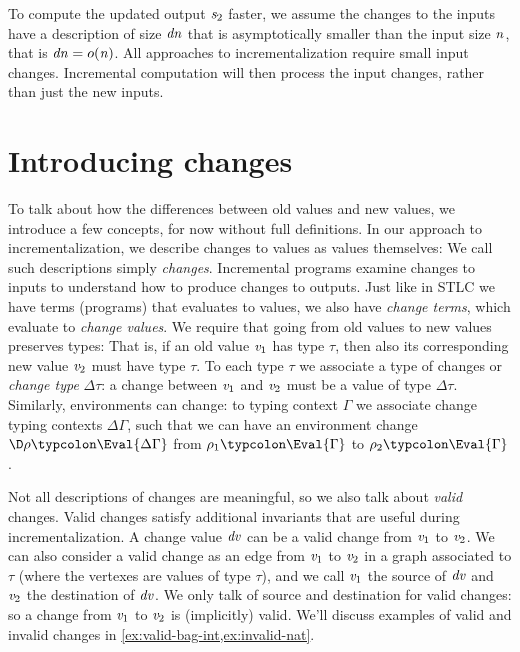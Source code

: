 To compute the updated output \ensuremath{\Varid{s}_{2}} faster, we assume the changes to the
inputs have a description of size \ensuremath{\Varid{dn}} that is asymptotically smaller than the
input size \ensuremath{\Varid{n}}, that is \ensuremath{\Varid{dn}\mathrel{=}o(\Varid{n})}. All approaches to incrementalization
require small input changes. Incremental computation will then process the input
changes, rather than just the new inputs.

\section{Introducing changes}
\label{sec:change-intro}
To talk about how the differences between old values and new
values, we introduce a few concepts, for now without full definitions.
In our approach to
incrementalization, we describe changes to values as values
themselves: We call such descriptions simply \emph{changes}.
Incremental programs examine changes to inputs to understand how to produce
changes to outputs. Just
like in STLC we have terms (programs) that evaluates to values,
we also have \emph{change terms}, which evaluate to \emph{change
  values}. We require that going from old values to new values
preserves types: That is, if an old value \ensuremath{\Varid{v}_{1}} has type \ensuremath{\tau},
then also its corresponding new value \ensuremath{\Varid{v}_{2}} must have type \ensuremath{\tau}.
To each type \ensuremath{\tau} we associate a type of changes or \emph{change type}
\ensuremath{\Delta \tau}: a change between \ensuremath{\Varid{v}_{1}} and \ensuremath{\Varid{v}_{2}} must be a value of type \ensuremath{\Delta \tau}.
Similarly, environments can change: to typing context \ensuremath{\Gamma} we associate
change typing contexts \ensuremath{\Delta \Gamma}, such that we can have an environment change
\ensuremath{\D\rho\typcolon\Eval{\Delta \Gamma}} from \ensuremath{\rho_{1}\typcolon\Eval{\Gamma}} to \ensuremath{\rho_{2}\typcolon\Eval{\Gamma}}.

Not all descriptions of changes are meaningful,
so we also talk about \emph{valid} changes. Valid changes satisfy additional
invariants that are useful during incrementalization.
%
A change value \ensuremath{\Varid{dv}} can be a valid change from \ensuremath{\Varid{v}_{1}} to \ensuremath{\Varid{v}_{2}}. We
can also consider a valid change as an edge from \ensuremath{\Varid{v}_{1}} to \ensuremath{\Varid{v}_{2}} in
a graph associated to \ensuremath{\tau} (where the vertexes are values of
type \ensuremath{\tau}), and we call \ensuremath{\Varid{v}_{1}} the source of \ensuremath{\Varid{dv}} and \ensuremath{\Varid{v}_{2}} the
destination of \ensuremath{\Varid{dv}}. We only talk of source and destination for valid changes:
so a change from \ensuremath{\Varid{v}_{1}} to \ensuremath{\Varid{v}_{2}} is (implicitly) valid.
We'll discuss examples of valid and invalid
changes in \cref{ex:valid-bag-int,ex:invalid-nat}.

